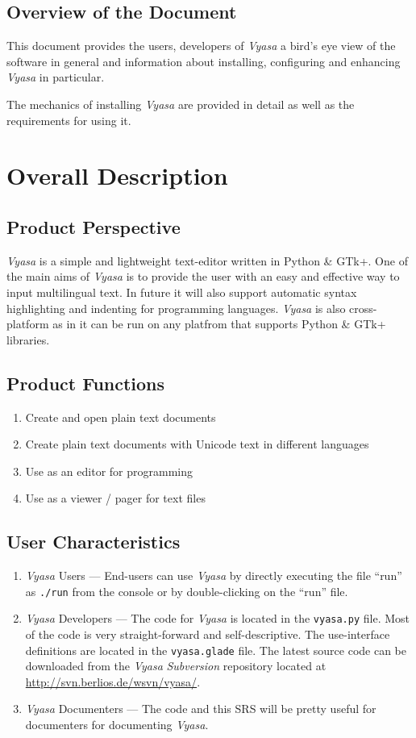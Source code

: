 \documentclass[12pt,a4paper]{article}
\newcommand{\VS}{\textit{Vyasa}}
\begin{document}
\subsection{Overview of the Document}
This document provides the users, developers of \VS{} a bird's eye view
of the software in general and information about installing, configuring
and enhancing \VS{} in particular.

The mechanics of installing \VS{} are provided in detail as well as the
requirements for using it.


\section{Overall Description}
\subsection{Product Perspective}
\VS{} is a simple and lightweight text-editor written in Python \&{}
GTk+. One of the main aims of \VS{} is to provide the user with an easy
and effective way to input multilingual text. In future it will also
support automatic syntax highlighting and indenting for programming
languages. \VS{} is also cross-platform as in it can be run on any
platfrom that supports Python \&{} GTk+ libraries.

\subsection{Product Functions}
\begin{enumerate}
\item Create and open plain text documents
\item Create plain text documents with Unicode text in different
  languages
\item Use as an editor for programming
\item Use as a viewer / pager for text files
\end{enumerate}

\subsection{User Characteristics}
\begin{enumerate}
\item \VS{} Users --- End-users can use \VS{} by directly executing the
  file ``run'' as \texttt{./run} from the console or by double-clicking on
  the ``run'' file.
\item \VS{} Developers --- The code for \VS{} is located in the
  \texttt{vyasa.py} file. Most of the code is very straight-forward and
  self-descriptive. The use-interface definitions are located in the
  \texttt{vyasa.glade} file. The latest source code can be downloaded
  from the \VS{} \textit{Subversion} repository located at
  \url{http://svn.berlios.de/wsvn/vyasa/}.
\item \VS{} Documenters --- The code and this SRS will be pretty useful
  for documenters for documenting \VS.
\end{enumerate}
\end{document}
